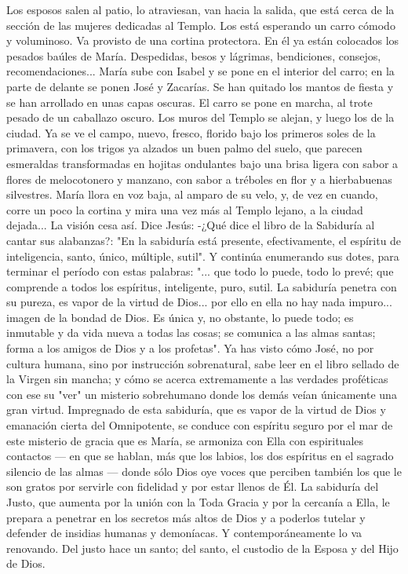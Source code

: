 \documentclass[12pt]{book} %
\begin{document}
Los esposos salen al patio, lo atraviesan, van hacia la salida, que está cerca de la sección de las mujeres dedicadas al Templo. Los está esperando un carro cómodo y voluminoso. Va provisto de una cortina protectora. En él ya están colocados los pesados baúles de María. 
Despedidas, besos y lágrimas, bendiciones, consejos, recomendaciones... María sube con Isabel y se pone en el interior 
del carro; en  la parte de delante se ponen José y Zacarías. Se han quitado los mantos de fiesta y se han arrollado en unas capas oscuras. 
El carro se pone en marcha, al trote pesado de un caballazo oscuro. Los muros del Templo se alejan, y luego los de la 
ciudad. Ya se ve el campo, nuevo, fresco, florido bajo los primeros soles de la primavera, con los trigos ya alzados un buen palmo del suelo, que parecen esmeraldas transformadas en hojitas ondulantes bajo una brisa ligera con sabor a flores de melocotonero y manzano, con sabor a tréboles en flor y a hierbabuenas silvestres. 
María llora en voz baja, al amparo de su velo, y, de vez en cuando, corre un poco la cortina y mira una vez más al Templo lejano, a la ciudad dejada... 
La visión cesa así. 
Dice Jesús: 
-¿Qué dice el libro de la Sabiduría al cantar sus alabanzas?: "En la sabiduría está presente, efectivamente, el espíritu de 
inteligencia, santo, único, múltiple, sutil". Y continúa enumerando sus dotes, para terminar el período con estas palabras: "... que todo lo puede, todo lo prevé; que comprende a todos los espíritus, inteligente, puro, sutil. La sabiduría penetra con su pureza, es vapor de la virtud de Dios... por ello en ella no hay nada impuro... imagen de la bondad de Dios. Es única y, no obstante, lo puede todo; es inmutable y da vida nueva a todas las cosas; se comunica a las almas santas; forma a los amigos de Dios y a los profetas". 
Ya has visto cómo José, no por cultura humana, sino por instrucción sobrenatural, sabe leer en el libro sellado de la Virgen sin mancha; y cómo se acerca extremamente a las verdades proféticas con ese su "ver" un misterio sobrehumano donde los demás veían únicamente una gran virtud. Impregnado de esta sabiduría, que es vapor de la virtud de Dios y emanación cierta del Omnipotente, se conduce con espíritu seguro por el mar de este misterio de gracia que es María, se armoniza con Ella con espirituales contactos — en que se hablan, más que los labios, los dos espíritus en el sagrado silencio de las almas — donde sólo Dios oye voces que perciben también los que le son gratos por servirle con fidelidad y por estar llenos de Él. 
La sabiduría del Justo, que aumenta por la unión con la Toda Gracia y por la cercanía a Ella, le prepara a penetrar en los secretos más altos de Dios y a poderlos tutelar y defender de insidias humanas y demoníacas. Y contemporáneamente lo va renovando. Del justo hace un santo; del santo, el custodio de la Esposa y del Hijo de Dios. 
\end{document}
